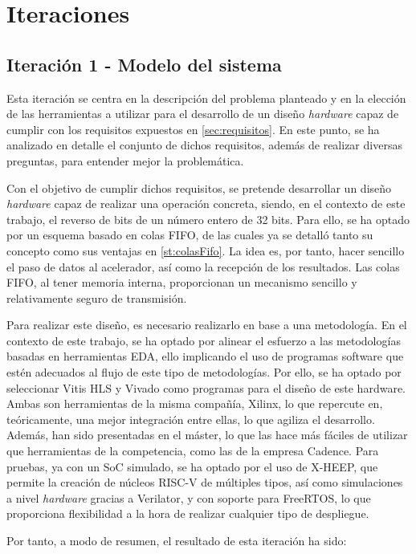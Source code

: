 \section{Iteraciones}

\subsection{Iteración 1 - Modelo del sistema}
\label{res:iteracion1}
Esta iteración se centra en la descripción del problema planteado y en la elección de las herramientas a utilizar para el desarrollo de un diseño \textit{hardware} capaz de cumplir con los requisitos expuestos en \ref{sec:requisitos}. En este punto, se ha analizado en detalle el conjunto de dichos requisitos, además de realizar diversas preguntas, para entender mejor la problemática.

Con el objetivo de cumplir dichos requisitos, se pretende desarrollar un diseño \textit{hardware} capaz de realizar una operación concreta, siendo, en el contexto de este trabajo, el reverso de bits de un número entero de 32 bits. Para ello, se ha optado por un esquema basado en colas \ac{FIFO}, de las cuales ya se detalló tanto su concepto como sus ventajas en \ref{st:colasFifo}. La idea es, por tanto, hacer sencillo el paso de datos al acelerador, así como la recepción de los resultados. Las colas FIFO, al tener memoria interna, proporcionan un mecanismo sencillo y relativamente seguro de transmisión.

Para realizar este diseño, es necesario realizarlo en base a una metodología. En el contexto de este trabajo, se ha optado por alinear el esfuerzo a las metodologías basadas en herramientas EDA, ello implicando el uso de programas software que estén adecuados al flujo de este tipo de metodologías. Por ello, se ha optado por seleccionar Vitis HLS y Vivado como programas para el diseño de este hardware. Ambas son herramientas de la misma compañía, Xilinx, lo que repercute en, teóricamente, una mejor integración entre ellas, lo que agiliza el desarrollo. Además, han sido presentadas en el máster, lo que las hace más fáciles de utilizar que herramientas de la competencia, como las de la empresa Cadence. Para pruebas, ya con un SoC simulado, se ha optado por el uso de X-HEEP, que permite la creación de núcleos RISC-V de múltiples tipos, así como simulaciones a nivel \textit{hardware} gracias a Verilator, y con soporte para FreeRTOS, lo que proporciona flexibilidad a la hora de realizar cualquier tipo de despliegue.

Por tanto, a modo de resumen, el resultado de esta iteración ha sido:

